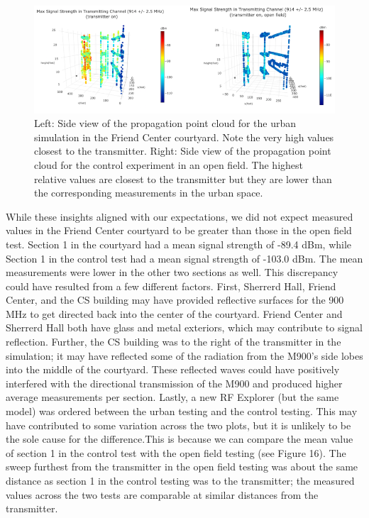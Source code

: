 \documentclass[pageno]{jpaper}
\begin{document}
\begin{figure}
	\caption{Left: Side view of the propagation point cloud for the urban simulation in the Friend Center courtyard. Note the very high values closest to the transmitter. Right: Side view of the propagation point cloud for the control experiment in an open field. The highest relative values are closest to the transmitter but they are lower than the corresponding measurements in the urban space. }
	\centerline{\includegraphics{friend_4}}
\end{figure}

While these insights aligned with our expectations, we did not expect measured values in the Friend Center courtyard to be greater than those in the open field test. Section 1 in the courtyard had a mean signal strength of -89.4 dBm, while Section 1 in the control test had a mean signal strength of -103.0 dBm. The mean measurements were lower in the other two sections as well. This discrepancy could have resulted from a few different factors. First, Sherrerd Hall, Friend Center, and the CS building may have provided reflective surfaces for the 900 MHz to get directed back into the center of the courtyard. Friend Center and Sherrerd Hall both have glass and metal exteriors, which may contribute to signal reflection. Further, the CS building was to the right of the transmitter in the simulation; it may have reflected some of the radiation from the M900's side lobes into the middle of the courtyard. These reflected waves could have positively interfered with the directional transmission of the M900 and produced higher average measurements per section. Lastly, a new RF Explorer (but the same model) was ordered between the urban testing and the control testing. This may have contributed to some variation across the two plots, but it is unlikely to be the sole cause for the difference.This is because we can compare the mean value of section 1 in the control test with the open field testing (see Figure 16). The sweep furthest from the transmitter in the open field testing was about the same distance as section 1 in the control testing was to the transmitter; the measured values across the two tests are comparable at similar distances from the transmitter.
\end{document}
